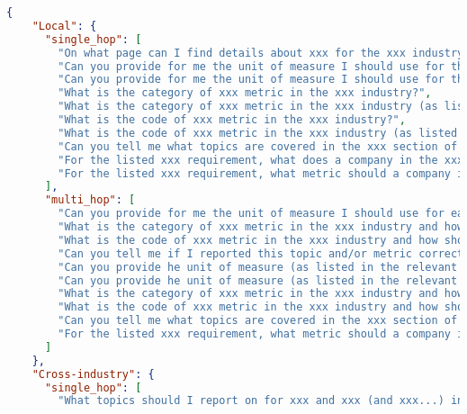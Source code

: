 \begin{appendices}
\begin{lstlisting}[language=json,firstnumber=1,label={lst:qa_structures},caption={User-representative sample questions for `CoT + Few-shot' question generation}]
{
    "Local": {
      "single_hop": [
        "On what page can I find details about xxx for the xxx industry?",
        "Can you provide for me the unit of measure I should use for the xxx metric in the xxx industry?",
        "Can you provide for me the unit of measure I should use for the xxx metric in the xxx industry (as listed in the relevant table)?",
        "What is the category of xxx metric in the xxx industry?",
        "What is the category of xxx metric in the xxx industry (as listed in the relevant table)?",
        "What is the code of xxx metric in the xxx industry?",
        "What is the code of xxx metric in the xxx industry (as listed in the relevant table)?",
        "Can you tell me what topics are covered in the xxx section of the xxx document?",
        "For the listed xxx requirement, what does a company in the xxx industry need to do?",
        "For the listed xxx requirement, what metric should a company in the xxx industry use for xxx?"
      ],
      "multi_hop": [
        "Can you provide for me the unit of measure I should use for each of the metrics for 'xxx' topic(s) in the xxx industry?",
        "What is the category of xxx metric in the xxx industry and how should this metric be calculated?",
        "What is the code of xxx metric in the xxx industry and how should this metric be calculated?",
        "Can you tell me if I reported this topic and/or metric correctly for the xxx industry?",
        "Can you provide he unit of measure (as listed in the relevant table) for all the metrics for xxx topic(s) in the xxx industry?",
        "Can you provide he unit of measure (as listed in the relevant table) for all the metrics for xxx topic(s) in the xxx industry and how should these metrics be calculated?",
        "What is the category of xxx metric in the xxx industry and how should this metric be disclosed?",
        "What is the code of xxx metric in the xxx industry and how should this metric be disclosed??",
        "Can you tell me what topics are covered in the xxx section of the xxx document and what are the key takeaways I need to know as a company writiny my sustainability report in the xxx industry?",
        "For the listed xxx requirement, what metric should a company in the xxx industry use for xxx and how should this metric be calculated?"
      ]
    },
    "Cross-industry": {
      "single_hop": [
        "What topics should I report on for xxx and xxx (and xxx...) industries?",

\end{lstlisting}
\end{appendices}
